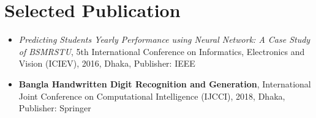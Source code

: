 \documentclass[]{deedy-resume-openfont}
\begin{document}
\begin{minipage}[t]{0.66\textwidth}
\section{Selected Publication}
\begin{itemize}
	\item \textit{Predicting Students Yearly Performance using Neural Network: A Case Study of BSMRSTU}, 5th International Conference on Informatics, Electronics and Vision (ICIEV), 2016, Dhaka, Publisher: IEEE
	\item \textbf{Bangla Handwritten Digit Recognition and Generation}, International Joint Conference on Computational Intelligence (IJCCI), 2018, Dhaka, Publisher: Springer
\end{itemize}
\sectionsep

%

%



\end{minipage}
\end{document}
